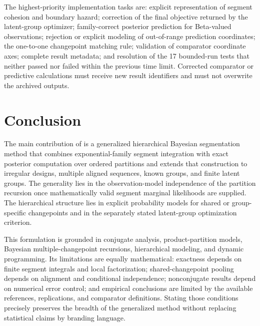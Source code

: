 The highest-priority implementation tasks are: explicit representation of segment cohesion and
boundary hazard; correction of the final objective returned by the latent-group optimizer;
family-correct posterior prediction for Beta-valued observations; rejection or explicit modeling of
out-of-range prediction coordinates; the one-to-one changepoint matching rule; validation of
comparator coordinate axes; complete result metadata; and resolution of the 17 bounded-run tests
that neither passed nor failed within the previous time limit. Corrected comparator or predictive
calculations must receive new result identifiers and must not overwrite the archived outputs.

\section{Conclusion}
The main contribution of \BayesBreak is a generalized hierarchical Bayesian segmentation method
that combines exponential-family segment integration with exact posterior computation over
ordered partitions and extends that construction to irregular designs, multiple aligned sequences,
known groups, and finite latent groups. The generality lies in the observation-model independence of
the partition recursion once mathematically valid segment marginal likelihoods are supplied. The
hierarchical structure lies in explicit probability models for shared or group-specific
changepoints and in the separately stated latent-group optimization criterion.

This formulation is grounded in conjugate analysis, product-partition models, Bayesian
multiple-changepoint recursions, hierarchical modeling, and dynamic programming. Its limitations
are equally mathematical: exactness depends on finite segment integrals and local factorization;
shared-changepoint pooling depends on alignment and conditional independence; nonconjugate results
depend on numerical error control; and empirical conclusions are limited by the available
references, replications, and comparator definitions. Stating those conditions precisely preserves
the breadth of the generalized method without replacing statistical claims by branding language.
